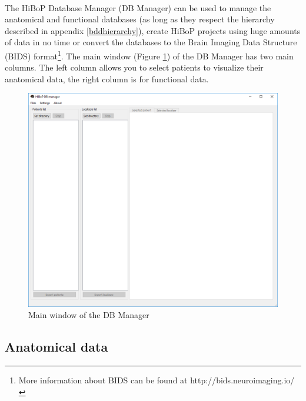\documentclass[a4paper]{article}
\begin{document}
\paragraph{} The HiBoP Database Manager (DB Manager) can be used to manage the anatomical and functional databases (as long as they respect the hierarchy described in appendix \ref{bddhierarchy}), create HiBoP projects using huge amounts of data in no time or convert the databases to the Brain Imaging Data Structure (BIDS) format\footnote{More information about BIDS can be found at http://bids.neuroimaging.io/}. The main window (Figure \ref{dbManagerMain}) of the DB Manager has two main columns. The left column allows you to select patients to visualize their anatomical data, the right column is for functional data.
\begin{figure}[H]
\begin{center}
\includegraphics[scale=0.3]{DBManagerMain.png}
\end{center}
\caption{\label{dbManagerMain}Main window of the DB Manager}
\end{figure}
\subsection{Anatomical data}
\end{document}
